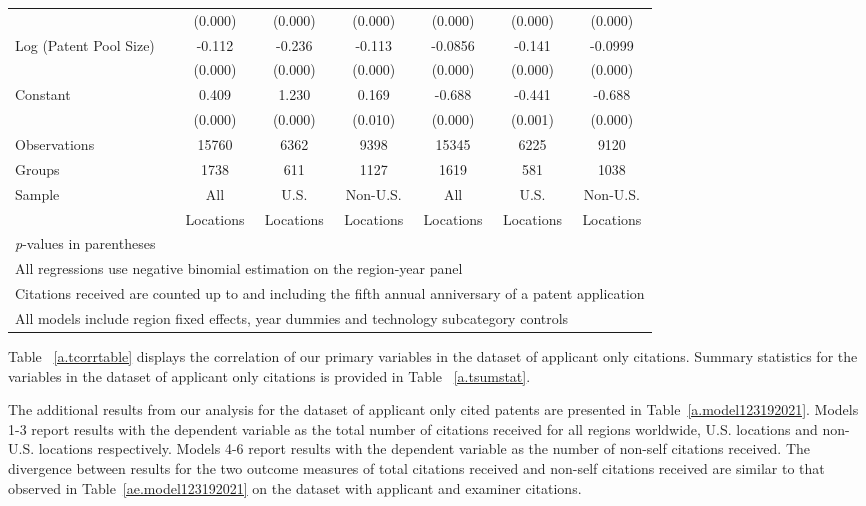 \documentclass[12pt,letterpaper]{article}
\begin{document}
\begin{table}[htbp]
\begin{tabular}{l*{6}{c}}
                &  (0.000)&  (0.000)&  (0.000)&  (0.000)&  (0.000)&  (0.000)\\
Log (Patent Pool Size)&   -0.112&   -0.236&   -0.113&  -0.0856&   -0.141&  -0.0999\\
                &  (0.000)&  (0.000)&  (0.000)&  (0.000)&  (0.000)&  (0.000)\\
Constant        &    0.409&    1.230&    0.169&   -0.688&   -0.441&   -0.688\\
                &  (0.000)&  (0.000)&  (0.010)&  (0.000)&  (0.001)&  (0.000)\\
\hline
Observations    &    15760&     6362&     9398&    15345&     6225&     9120\\
Groups          &     1738&      611&     1127&     1619&      581&     1038\\
Sample&All &U.S. &Non-U.S.&All &U.S. &Non-U.S. \\
          &Locations &Locations&Locations&Locations &Locations&Locations \\
\hline\hline
\multicolumn{7}{l}{\footnotesize \textit{p}-values in parentheses}\\
\multicolumn{7}{l}{\footnotesize All regressions use negative binomial estimation on the region-year panel}\\
\multicolumn{7}{l}{\footnotesize Citations received are counted up to and including the fifth annual anniversary of a patent application}\\
\multicolumn{7}{l}{\footnotesize All models include region fixed effects, year dummies and technology subcategory controls}\\
\end{tabular}
\end{table}


Table ~\ref{a.tcorrtable} displays the correlation of our primary variables in the dataset of applicant only citations. Summary statistics for the variables in the dataset of applicant only citations is provided in Table ~\ref{a.tsumstat}.








The additional results from our analysis for the dataset of applicant only cited patents are presented in Table~\ref{a.model123192021}. Models 1-3 report results with the dependent variable as the total number of citations received for all regions worldwide, U.S. locations and non-U.S. locations respectively. Models 4-6 report results with the dependent variable as the number of non-self citations received. The divergence between results for the two outcome measures of total citations received and non-self citations received are similar to that observed in Table~\ref{ae.model123192021} on the dataset with applicant and examiner citations. \par
\end{document}
